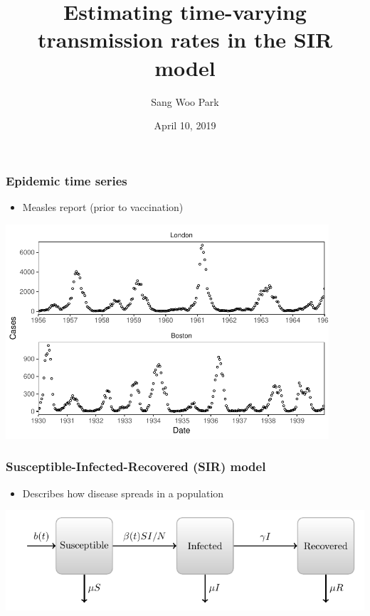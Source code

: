 \documentclass{beamer}
\begin{document}
\title[Math 4P06 Presentation] %
{Estimating time-varying transmission rates in the SIR model}

\author[Sang Woo Park] %
{Sang Woo Park}


\date[2019] %
{April 10, 2019}

\frame{\titlepage}

\begin{frame}
\frametitle{Epidemic time series}
\begin{itemize}
    \item Measles report (prior to vaccination)
\end{itemize}
\begin{center}
\includegraphics[width=0.9\textwidth]{fig1.pdf}
\end{center}
\end{frame}

\begin{frame}
\frametitle{Susceptible-Infected-Recovered (SIR) model}
\begin{itemize}
    \item Describes how disease spreads in a population \citep{kermack1927contribution}
\end{itemize}
\begin{center}
\includegraphics[width=\textwidth]{model_diagram.pdf}
\end{center}
\end{frame}
\end{document}
